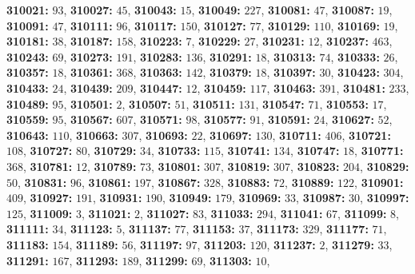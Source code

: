 \textsf{\bfseries 310021:} $93$, \textsf{\bfseries 310027:} $45$, \textsf{\bfseries 310043:} $15$, \textsf{\bfseries 310049:} $227$, \textsf{\bfseries 310081:} $47$, \textsf{\bfseries 310087:} $19$, \textsf{\bfseries 310091:} $47$, \textsf{\bfseries 310111:} $96$, \textsf{\bfseries 310117:} $150$, \textsf{\bfseries 310127:} $77$, \textsf{\bfseries 310129:} $110$, \textsf{\bfseries 310169:} $19$, \textsf{\bfseries 310181:} $38$, \textsf{\bfseries 310187:} $158$, \textsf{\bfseries 310223:} $7$, \textsf{\bfseries 310229:} $27$, \textsf{\bfseries 310231:} $12$, \textsf{\bfseries 310237:} $463$, \textsf{\bfseries 310243:} $69$, \textsf{\bfseries 310273:} $191$, \textsf{\bfseries 310283:} $136$, \textsf{\bfseries 310291:} $18$, \textsf{\bfseries 310313:} $74$, \textsf{\bfseries 310333:} $26$, \textsf{\bfseries 310357:} $18$, \textsf{\bfseries 310361:} $368$, \textsf{\bfseries 310363:} $142$, \textsf{\bfseries 310379:} $18$, \textsf{\bfseries 310397:} $30$, \textsf{\bfseries 310423:} $304$, \textsf{\bfseries 310433:} $24$, \textsf{\bfseries 310439:} $209$, \textsf{\bfseries 310447:} $12$, \textsf{\bfseries 310459:} $117$, \textsf{\bfseries 310463:} $391$, \textsf{\bfseries 310481:} $233$, \textsf{\bfseries 310489:} $95$, \textsf{\bfseries 310501:} $2$, \textsf{\bfseries 310507:} $51$, \textsf{\bfseries 310511:} $131$, \textsf{\bfseries 310547:} $71$, \textsf{\bfseries 310553:} $17$, \textsf{\bfseries 310559:} $95$, \textsf{\bfseries 310567:} $607$, \textsf{\bfseries 310571:} $98$, \textsf{\bfseries 310577:} $91$, \textsf{\bfseries 310591:} $24$, \textsf{\bfseries 310627:} $52$, \textsf{\bfseries 310643:} $110$, \textsf{\bfseries 310663:} $307$, \textsf{\bfseries 310693:} $22$, \textsf{\bfseries 310697:} $130$, \textsf{\bfseries 310711:} $406$, \textsf{\bfseries 310721:} $108$, \textsf{\bfseries 310727:} $80$, \textsf{\bfseries 310729:} $34$, \textsf{\bfseries 310733:} $115$, \textsf{\bfseries 310741:} $134$, \textsf{\bfseries 310747:} $18$, \textsf{\bfseries 310771:} $368$, \textsf{\bfseries 310781:} $12$, \textsf{\bfseries 310789:} $73$, \textsf{\bfseries 310801:} $307$, \textsf{\bfseries 310819:} $307$, \textsf{\bfseries 310823:} $204$, \textsf{\bfseries 310829:} $50$, \textsf{\bfseries 310831:} $96$, \textsf{\bfseries 310861:} $197$, \textsf{\bfseries 310867:} $328$, \textsf{\bfseries 310883:} $72$, \textsf{\bfseries 310889:} $122$, \textsf{\bfseries 310901:} $409$, \textsf{\bfseries 310927:} $191$, \textsf{\bfseries 310931:} $190$, \textsf{\bfseries 310949:} $179$, \textsf{\bfseries 310969:} $33$, \textsf{\bfseries 310987:} $30$, \textsf{\bfseries 310997:} $125$, \textsf{\bfseries 311009:} $3$, \textsf{\bfseries 311021:} $2$, \textsf{\bfseries 311027:} $83$, \textsf{\bfseries 311033:} $294$, \textsf{\bfseries 311041:} $67$, \textsf{\bfseries 311099:} $8$, \textsf{\bfseries 311111:} $34$, \textsf{\bfseries 311123:} $5$, \textsf{\bfseries 311137:} $77$, \textsf{\bfseries 311153:} $37$, \textsf{\bfseries 311173:} $329$, \textsf{\bfseries 311177:} $71$, \textsf{\bfseries 311183:} $154$, \textsf{\bfseries 311189:} $56$, \textsf{\bfseries 311197:} $97$, \textsf{\bfseries 311203:} $120$, \textsf{\bfseries 311237:} $2$, \textsf{\bfseries 311279:} $33$, \textsf{\bfseries 311291:} $167$, \textsf{\bfseries 311293:} $189$, \textsf{\bfseries 311299:} $69$, \textsf{\bfseries 311303:} $10$, 
